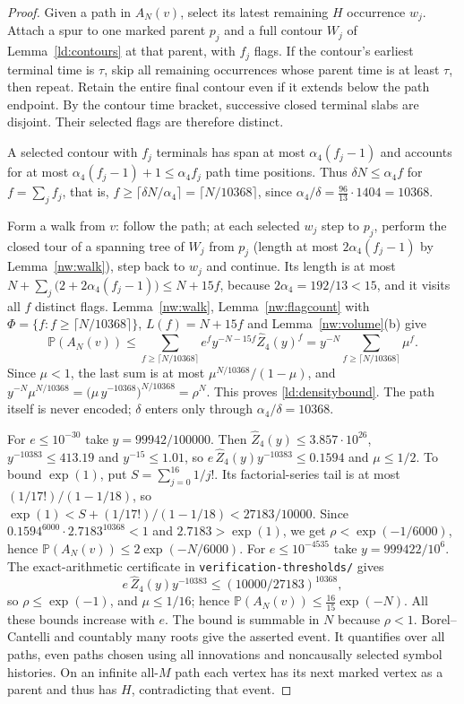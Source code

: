 \begin{proof}
Given a path in $A_N(v)$, select its latest remaining $H$ occurrence $w_j$. Attach a spur to one
marked parent $p_j$ and a full contour $W_j$ of Lemma~\ref{ld:contours} at that parent, with $f_j$
flags. If the contour's earliest terminal time is $\tau$, skip all remaining occurrences whose parent
time is at least $\tau$, then repeat. Retain the entire final contour even if it extends below the
path endpoint. By the contour time bracket, successive closed terminal slabs are disjoint. Their
selected flags are therefore distinct.

A selected contour with $f_j$ terminals has span at most $\alpha_4(f_j-1)$ and accounts for at most
$\alpha_4(f_j-1)+1\le\alpha_4f_j$ path time positions. Thus $\delta N\le\alpha_4f$ for $f=\sum_jf_j$,
that is, $f\ge\lceil\delta N/\alpha_4\rceil=\lceil N/10368\rceil$, since
$\alpha_4/\delta=\frac{96}{13}\cdot1404=10368$.

Form a walk from $v$: follow the path; at each selected $w_j$ step to $p_j$, perform the closed tour
of a spanning tree of $W_j$ from $p_j$ (length at most $2\alpha_4(f_j-1)$ by Lemma~\ref{nw:walk}),
step back to $w_j$ and continue. Its length is at most
$N+\sum_j\bigl(2+2\alpha_4(f_j-1)\bigr)\le N+15f$, because $2\alpha_4=192/13<15$, and it visits all
$f$ distinct flags. Lemma~\ref{nw:walk}, Lemma~\ref{nw:flagcount} with
$\Phi=\{f:f\ge\lceil N/10368\rceil\}$, $L(f)=N+15f$ and Lemma~\ref{nw:volume}(b) give
\[
  \mathbb{P}(A_N(v))\le\sum_{f\ge\lceil N/10368\rceil}e^fy^{-N-15f}\widehat Z_4(y)^f
  =y^{-N}\sum_{f\ge\lceil N/10368\rceil}\mu^f .
\]
Since $\mu<1$, the last sum is at most $\mu^{N/10368}/(1-\mu)$, and
$y^{-N}\mu^{N/10368}=\bigl(\mu\,y^{-10368}\bigr)^{N/10368}=\rho^N$. This proves \eqref{ld:densitybound}.
The path itself is never encoded; $\delta$ enters only through $\alpha_4/\delta=10368$.

For $e\le10^{-30}$ take $y=99942/100000$. Then $\widehat Z_4(y)\le3.857\cdot10^{26}$,
$y^{-10383}\le413.19$ and $y^{-15}\le1.01$, so $e\,\widehat Z_4(y)y^{-10383}\le0.1594$ and
$\mu\le1/2$. To bound $\exp(1)$, put $S=\sum_{j=0}^{16}1/j!$. Its factorial-series tail is at most $(1/17!)/(1-1/18)$, so $\exp(1)<S+(1/17!)/(1-1/18)<27183/10000$. Since $0.1594^{6000}\cdot2.7183^{10368}<1$ and $2.7183>\exp(1)$, we get
$\rho<\exp(-1/6000)$, hence $\mathbb{P}(A_N(v))\le2\exp(-N/6000)$. For $e\le10^{-4535}$ take
$y=999422/10^6$. The exact-arithmetic certificate in \texttt{verification-\allowbreak thresholds/} gives
\[
 e\,\widehat Z_4(y)y^{-10383}\le(10000/27183)^{10368},
\]
so
$\rho\le\exp(-1)$, and $\mu\le1/16$; hence $\mathbb{P}(A_N(v))\le\frac{16}{15}\exp(-N)$. All these bounds
increase with $e$. The bound is summable in $N$ because $\rho<1$. Borel--Cantelli and countably many
roots give the asserted event. It quantifies over all paths, even paths chosen using all
innovations and noncausally selected symbol histories. On an infinite all-$M$ path each vertex has
its next marked vertex as a parent and thus has $H$, contradicting that event.
\end{proof}

